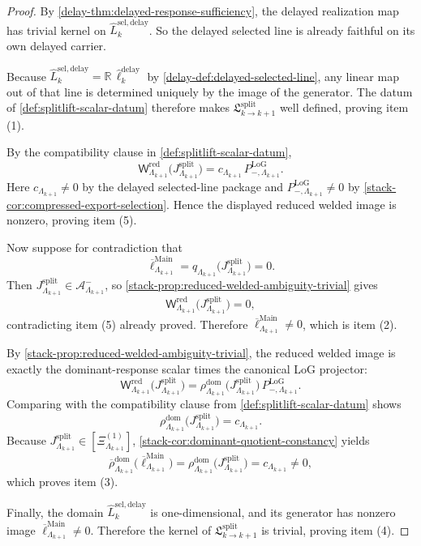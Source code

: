 \documentclass[11pt]{article}
\theoremstyle{definition}
\theoremstyle{plain}
\theoremstyle{remark}
\newcommand{\1}{\mathbf 1}
\begin{document}
\begin{proof}
By \cref{delay-thm:delayed-response-sufficiency}, the delayed realization map has trivial kernel on
\(
\widehat L^{\mathrm{sel,delay}}_k
\).
So the delayed selected line is already faithful on its own delayed carrier.

Because
\(
\widehat L^{\mathrm{sel,delay}}_k
=
\mathbb R\,\widehat\ell^{\mathrm{delay}}_k
\)
by \cref{delay-def:delayed-selected-line}, any linear map out of that line is determined uniquely by
the image of the generator.
The datum of \cref{def:splitlift-scalar-datum} therefore makes
\(
\mathfrak L^{\mathrm{split}}_{k\to k+1}
\)
well defined, proving item \textnormal{(1)}.

By the compatibility clause in \cref{def:splitlift-scalar-datum},
\[
\mathsf W^{\mathrm{red}}_{\Lambda_{k+1}}
\!\bigl(J^{\mathrm{split}}_{\Lambda_{k+1}}\bigr)
=
c_{\Lambda_{k+1}}\,
P^{\mathrm{LoG}}_{-,\Lambda_{k+1}}.
\]
Here
\(
c_{\Lambda_{k+1}}\neq 0
\)
by the delayed selected-line package and
\(
P^{\mathrm{LoG}}_{-,\Lambda_{k+1}}\neq 0
\)
by \cref{stack-cor:compressed-export-selection}.
Hence the displayed reduced welded image is nonzero, proving item \textnormal{(5)}.

Now suppose for contradiction that
\[
\overline\ell^{\mathrm{Main}}_{\Lambda_{k+1}}
=
q_{\Lambda_{k+1}}\!\bigl(J^{\mathrm{split}}_{\Lambda_{k+1}}\bigr)
=
0.
\]
Then
\(
J^{\mathrm{split}}_{\Lambda_{k+1}}\in \mathcal A^-_{\Lambda_{k+1}}
\),
so \cref{stack-prop:reduced-welded-ambiguity-trivial} gives
\[
\mathsf W^{\mathrm{red}}_{\Lambda_{k+1}}
\!\bigl(J^{\mathrm{split}}_{\Lambda_{k+1}}\bigr)
=
0,
\]
contradicting item \textnormal{(5)} already proved.
Therefore
\(
\overline\ell^{\mathrm{Main}}_{\Lambda_{k+1}}\neq 0
\),
which is item \textnormal{(2)}.

By \cref{stack-prop:reduced-welded-ambiguity-trivial}, the reduced welded image is exactly the
dominant-response scalar times the canonical LoG projector:
\[
\mathsf W^{\mathrm{red}}_{\Lambda_{k+1}}
\!\bigl(J^{\mathrm{split}}_{\Lambda_{k+1}}\bigr)
=
\rho^{\mathrm{dom}}_{\Lambda_{k+1}}
\!\bigl(J^{\mathrm{split}}_{\Lambda_{k+1}}\bigr)\,
P^{\mathrm{LoG}}_{-,\Lambda_{k+1}}.
\]
Comparing with the compatibility clause from \cref{def:splitlift-scalar-datum} shows
\[
\rho^{\mathrm{dom}}_{\Lambda_{k+1}}
\!\bigl(J^{\mathrm{split}}_{\Lambda_{k+1}}\bigr)
=
c_{\Lambda_{k+1}}.
\]
Because
\(
J^{\mathrm{split}}_{\Lambda_{k+1}}
\in
[\Xi^{(1)}_{\Lambda_{k+1}}]
\),
\cref{stack-cor:dominant-quotient-constancy} yields
\[
\overline{\rho}^{\mathrm{dom}}_{\Lambda_{k+1}}
\bigl(
\overline\ell^{\mathrm{Main}}_{\Lambda_{k+1}}
\bigr)
=
\rho^{\mathrm{dom}}_{\Lambda_{k+1}}
\!\bigl(J^{\mathrm{split}}_{\Lambda_{k+1}}\bigr)
=
c_{\Lambda_{k+1}}
\neq 0,
\]
which proves item \textnormal{(3)}.

Finally, the domain
\(
\widehat L^{\mathrm{sel,delay}}_k
\)
is one-dimensional, and its generator has nonzero image
\(
\overline\ell^{\mathrm{Main}}_{\Lambda_{k+1}}\neq 0
\).
Therefore the kernel of
\(
\mathfrak L^{\mathrm{split}}_{k\to k+1}
\)
is trivial, proving item \textnormal{(4)}.
\end{proof}
\end{document}
